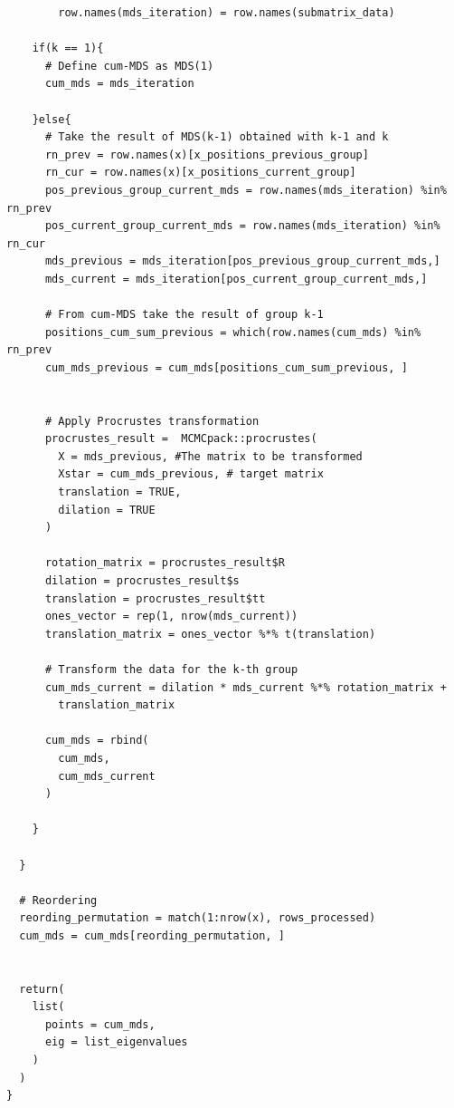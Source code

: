 \documentclass[11pt]{report}
\begin{document}
\begin{lstlisting}
        row.names(mds_iteration) = row.names(submatrix_data)
    
    if(k == 1){
      # Define cum-MDS as MDS(1)
      cum_mds = mds_iteration
      
    }else{
      # Take the result of MDS(k-1) obtained with k-1 and k
      rn_prev = row.names(x)[x_positions_previous_group]  
      rn_cur = row.names(x)[x_positions_current_group] 
      pos_previous_group_current_mds = row.names(mds_iteration) %in% rn_prev 
      pos_current_group_current_mds = row.names(mds_iteration) %in% rn_cur
      mds_previous = mds_iteration[pos_previous_group_current_mds,]  
      mds_current = mds_iteration[pos_current_group_current_mds,]
      
      # From cum-MDS take the result of group k-1
      positions_cum_sum_previous = which(row.names(cum_mds) %in% rn_prev
      cum_mds_previous = cum_mds[positions_cum_sum_previous, ] 
      
      
      # Apply Procrustes transformation
      procrustes_result =  MCMCpack::procrustes(
        X = mds_previous, #The matrix to be transformed
        Xstar = cum_mds_previous, # target matrix
        translation = TRUE, 
        dilation = TRUE
      )
      
      rotation_matrix = procrustes_result$R
      dilation = procrustes_result$s
      translation = procrustes_result$tt
      ones_vector = rep(1, nrow(mds_current)) 
      translation_matrix = ones_vector %*% t(translation)
      
      # Transform the data for the k-th group  
      cum_mds_current = dilation * mds_current %*% rotation_matrix + 
        translation_matrix
      
      cum_mds = rbind(
        cum_mds,
        cum_mds_current
      )
      
    }
    
  }
  
  # Reordering
  reording_permutation = match(1:nrow(x), rows_processed)
  cum_mds = cum_mds[reording_permutation, ]
  
  
  return(
    list(
      points = cum_mds,
      eig = list_eigenvalues 
    )
  )
}
\end{lstlisting}

\newpage
\end{document}
